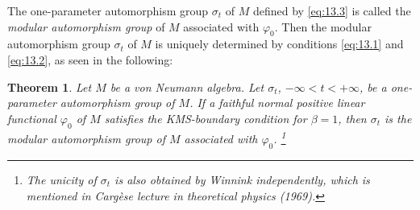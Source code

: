 \documentclass[12pt,b5paper,twoside]{article}
\theoremstyle{takesaki}
\newtheorem{theorem}{Theorem}[section]
\numberwithin{equation}{section}
\begin{document}
The one-parameter automorphism group $\sigma_t$ of $M$ defined by
\eqref{eq:13.3} is called the \emph{modular automorphism group} of
$M$ associated with $\varphi_0$.  Then the modular automorphism group
$\sigma_t$ of $M$ is uniquely determined by conditions
\eqref{eq:13.1} and \eqref{eq:13.2}, as seen in the following:

\begin{theorem}\label{thm:13.2}
Let $M$ be a von Neumann algebra.  Let $\sigma_t$,
$-\infty<t<+\infty$, be a one-parameter automorphism group of $M$.
If a faithful normal positive linear functional $\varphi_0$ of $M$
satisfies the
KMS-boundary condition for $\beta=1$, then $\sigma_t$ is the modular
automorphism group of $M$ associated with $\varphi_0$.
\footnote{The unicity of $\sigma_t$ is also obtained by Winnink
independently, which is mentioned in Carg\`ese lecture in theoretical
physics (1969).}
\end{theorem}
\end{document}
